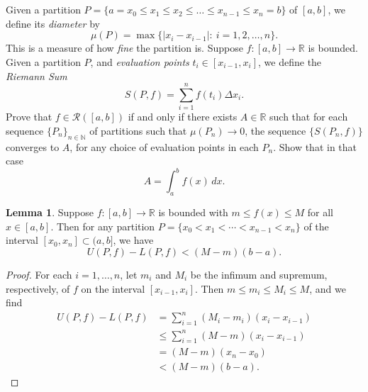 \documentclass[12pt]{article}
\newenvironment{problem}
    {\begin{lrbox}{\mybox}\begin{minipage}{0.98\textwidth}}
    {\end{minipage}\end{lrbox}\begin{center}\framebox[\textwidth]{\usebox{\mybox}}\end{center}}
\theoremstyle{definition}
\newtheorem{lemma}{Lemma}
\newcommand{\N}{\mathbb{N}}
\newcommand{\R}{\mathbb{R}}
\begin{document}
\section{}
\begin{problem}
    Given a partition $P=\{a=x_0\le x_1 \le x_2 \le \ldots \le x_{n-1}\le x_n=b\}$ of $[a,b]$, we define its \emph{diameter} by 
    \begin{equation}
    \mu(P) = \max \{ |x_i-x_{i-1}|:\ i=1,2,\ldots,n\}.
    \end{equation}
    This is a measure of how {\it fine} the partition is. 
    Suppose $f:[a,b]\to \R$ is bounded. Given a partition $P$, and \emph{evaluation points} $t_i \in [x_{i-1},x_i]$, we define the \emph{Riemann Sum} 
    \begin{equation}
    S(P,f) = \sum_{i=1}^n f(t_i) \Delta x_i.
    \end{equation}
    Prove that $f\in \mathcal{R}([a,b])$ if and only if there exists $A\in \R$ such that for each sequence $\{P_n\}_{n\in \N}$ of partitions such that $\mu(P_n) \to 0$, the sequence $\{S(P_n,f)\}$ converges to $A$, for any choice of  evaluation points in each $P_n$. Show that in that case 
    \begin{equation}
    A = \int_a^bf(x)\,dx.
    \end{equation}
\end{problem}

\begin{lemma}
    Suppose $f : [a, b] \to \R$ is bounded with $m \leq f(x) \leq M$ for all $x \in [a, b]$. Then for any partition $P = \{x_0 < x_1 < \cdots < x_{n-1} < x_n\}$ of the interval $[x_0, x_n] \subset (a, b]$, we have
    \[
        U(P, f) - L(P, f) < (M - m)(b - a).
    \]
\end{lemma}

\begin{proof}
    For each $i = 1, \dots, n$, let $m_i$ and $M_i$ be the infimum and supremum, respectively, of $f$ on the interval $[x_{i-1}, x_i]$. Then $m \leq m_i \leq M_i \leq M$, and we find
    \begin{align*}
        U(P, f) - L(P, f) 
            &= \sum_{i=1}^n (M_i - m_i)(x_i - x_{i - 1}) \\
            &\leq \sum_{i=1}^n (M - m)(x_i - x_{i - 1}) \\
            &= (M - m)(x_n - x_0) \\
            &< (M - m)(b - a).
    \end{align*}
    
\end{proof}
\end{document}
